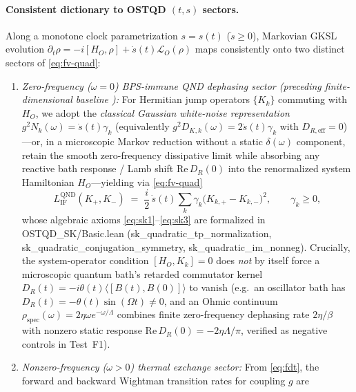 \documentclass[11pt,a4paper]{article}
\theoremstyle{definition}
\theoremstyle{remark}
\newcommand{\cL}{\mathcal{L}}
\newcommand{\1}{\mathbf{1}}
\newcommand{\code}[1]{{\scriptsize\ttfamily #1}}
\begin{document}
\paragraph{Consistent dictionary to OSTQD $(t,s)$ sectors.}
Along a monotone clock parametrization $s = s(t)$ ($\dot{s}\ge 0$), Markovian GKSL evolution $\partial_t \rho = -i[H_O, \rho] + \dot{s}(t)\cL_O(\rho)$ maps consistently onto two distinct sectors of \eqref{eq:fv-quad}:
\begin{enumerate}
  \item \emph{Zero-frequency ($\omega=0$) BPS-immune QND dephasing sector (preceding finite-dimensional baseline \cite{Soga2026OSTQD}):} For Hermitian jump operators $\{K_k\}$ commuting with $H_O$, we adopt the \emph{classical Gaussian white-noise representation} $g^2 N_k(\omega) = \dot{s}(t)\gamma_k$ (equivalently $g^2 D_{K,k}(\omega) = 2\dot{s}(t)\gamma_k$ with $D_{R,\mathrm{eff}} = 0$)---or, in a microscopic Markov reduction without a static $\delta(\omega)$ component, retain the smooth zero-frequency dissipative limit while absorbing any reactive bath response / Lamb shift $\mathrm{Re}\,D_R(0)$ into the renormalized system Hamiltonian $H_O$---yielding via \eqref{eq:fv-quad}
  \begin{equation}\label{eq:sk-qnd}
    L_{\mathrm{IF}}^{\mathrm{QND}}(K_+, K_-) \;=\; \frac{i}{2}\,\dot{s}(t)\sum_k \gamma_k \bigl(K_{k,+} - K_{k,-}\bigr)^2, \qquad \gamma_k \ge 0,
  \end{equation}
  whose algebraic axioms \eqref{eq:sk1}--\eqref{eq:sk3} are formalized in \code{OSTQD\_\allowbreak SK/\allowbreak Basic.lean} (\code{sk\_\allowbreak quad\allowbreak ratic\_\allowbreak tp\_\allowbreak norm\allowbreak alization}, \code{sk\_\allowbreak quad\allowbreak ratic\_\allowbreak conju\allowbreak gation\_\allowbreak symmetry}, \code{sk\_\allowbreak quad\allowbreak ratic\_\allowbreak im\_\allowbreak nonneg}). Crucially, the system-operator condition $[H_O,K_k]=0$ does \emph{not} by itself force a microscopic quantum bath's retarded commutator kernel $D_R(t)=-i\theta(t)\langle[B(t),B(0)]\rangle$ to vanish (e.g.\ an oscillator bath has $D_R(t)=-\theta(t)\sin(\Omega t)\neq 0$, and an Ohmic continuum $\rho_{\mathrm{spec}}(\omega)=2\eta\omega e^{-\omega/\Lambda}$ combines finite zero-frequency dephasing rate $2\eta/\beta$ with nonzero static response $\mathrm{Re}\,D_R(0)=-2\eta\Lambda/\pi$, verified as negative controls in Test~F1).
  \item \emph{Nonzero-frequency ($\omega>0$) thermal exchange sector:} From \eqref{eq:fdt}, the forward and backward Wightman transition rates for coupling $g$ are

\end{enumerate}
\end{document}

